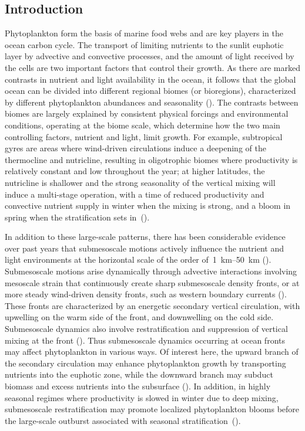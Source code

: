 \subsection{Introduction}

Phytoplankton form the basis of marine food webs and are key players in the ocean carbon cycle.
The transport of limiting nutrients to the sunlit euphotic layer by advective and convective processes, and the amount of light received by the cells  are two important factors that control their growth.
As there are marked contrasts in nutrient and light availability in the ocean, it follows that the global ocean can be divided into different regional biomes (or bioregions), characterized by different phytoplankton abundances and seasonality (\cite{longhurst_2007, vichi_2011a, bock_2022}).
The contrasts between biomes are largely explained by consistent physical forcings and environmental conditions, operating at the biome scale, which determine how the two main controlling factors, nutrient and light, limit growth.
For example, subtropical gyres are areas where wind-driven circulations induce a deepening of the thermocline and nutricline, resulting in oligotrophic biomes where productivity is relatively constant and low throughout the year; at higher latitudes, the nutricline is shallower and the strong seasonality of the vertical mixing will induce a multi-stage operation, with a time of reduced productivity and convective nutrient supply in winter when the mixing is strong, and a bloom in spring when the stratification sets in~(\cite{wilson_2005, williams_2011}).

In addition to these large-scale patterns, there has been considerable evidence over past years that submesoscale motions actively influence the nutrient and light environments at the horizontal scale of the order of~\qtyrange{1}{50}{\km} (\cite[see reviews by][]{levy_2012, mahadevan_2016, levy_2018}).
Submesoscale motions arise dynamically through advective interactions involving mesoscale strain that continuously create sharp submesoscale density fronts, or at more steady wind-driven density fronts, such as western boundary currents (\cite{thomas_2008, mcwilliams_2016, mahadevan_2020}).
These fronts are characterized by an energetic secondary vertical circulation, with upwelling on the warm side of the front, and downwelling on the cold side.
Submesoscale dynamics also involve restratification and suppression of vertical mixing at the front (\cite{thomas_2008a}).
Thus submesoscale dynamics occurring at ocean fronts may affect phytoplankton in various ways.
Of interest here, the upward branch of the secondary circulation may enhance phytoplankton growth by transporting nutrients into the euphotic zone, while the downward branch may subduct biomass and excess nutrients into the subsurface (\cite{calil_2011, omand_2015, hauschildt_2021}).
In addition, in highly seasonal regimes where productivity is slowed in winter due to deep mixing, submesoscale restratification may promote localized phytoplankton blooms before the large-scale outburst associated with seasonal stratification~(\cite{mahadevan_2012}).

